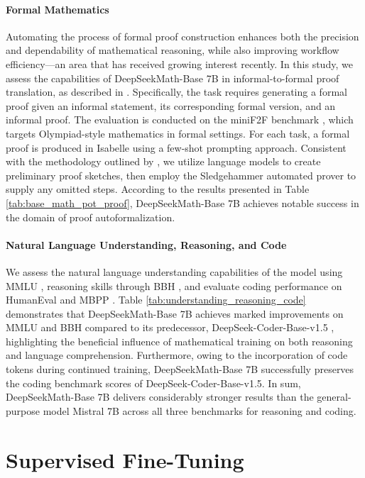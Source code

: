 \paragraph{Formal Mathematics}

Automating the process of formal proof construction enhances both the precision and dependability of mathematical reasoning, while also improving workflow efficiency—an area that has received growing interest recently. In this study, we assess the capabilities of DeepSeekMath-Base 7B in informal-to-formal proof translation, as described in \citep{dsp_proof}. Specifically, the task requires generating a formal proof given an informal statement, its corresponding formal version, and an informal proof. The evaluation is conducted on the miniF2F benchmark \citep{minif2f}, which targets Olympiad-style mathematics in formal settings. For each task, a formal proof is produced in Isabelle using a few-shot prompting approach. Consistent with the methodology outlined by \cite{dsp_proof}, we utilize language models to create preliminary proof sketches, then employ the Sledgehammer automated prover \citep{sledgehammer} to supply any omitted steps. According to the results presented in Table \ref{tab:base_math_pot_proof}, DeepSeekMath-Base 7B achieves notable success in the domain of proof autoformalization.

\paragraph{Natural Language Understanding, Reasoning, and Code}

We assess the natural language understanding capabilities of the model using MMLU \citep{mmlu}, reasoning skills through BBH \citep{bbh}, and evaluate coding performance on HumanEval \citep{codex} and MBPP \citep{mbpp}. Table \ref{tab:understanding_reasoning_code} demonstrates that DeepSeekMath-Base 7B achieves marked improvements on MMLU and BBH compared to its predecessor, DeepSeek-Coder-Base-v1.5 \citep{deepseek-coder}, highlighting the beneficial influence of mathematical training on both reasoning and language comprehension. Furthermore, owing to the incorporation of code tokens during continued training, DeepSeekMath-Base 7B successfully preserves the coding benchmark scores of DeepSeek-Coder-Base-v1.5. In sum, DeepSeekMath-Base 7B delivers considerably stronger results than the general-purpose model Mistral 7B \citep{mistral} across all three benchmarks for reasoning and coding.

\section{Supervised Fine-Tuning}

